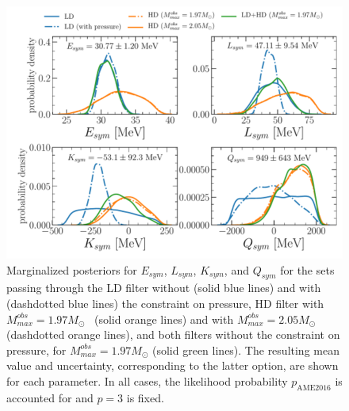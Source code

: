 \begin{figure}[!t]
\begin{center}
  \includegraphics[width=1.0\linewidth]{figures/iv_dist.pdf}
\end{center}
\caption[Marginalized posteriors for isovector empirical parameters assuming
different filters]{Marginalized posteriors for $E_{sym}$, $L_{sym}$, $K_{sym}$, 
and $Q_{sym}$ for the sets passing through the LD filter without (solid blue
lines) and with (dashdotted blue lines) the constraint on pressure, HD
filter with $M_{max}^{obs}=1.97M_\odot$~\cite{Antoniadis2013} (solid orange
lines) and with $M_{max}^{obs}=2.05M_\odot$~\cite{Cromartie2020}
(dashdotted orange lines), and both filters without the constraint on 
pressure, for $M_{max}^{obs}=1.97M_\odot$ (solid green lines). The resulting 
mean value and uncertainty, corresponding to the latter option, are shown for 
each parameter. In all cases, the likelihood probability $p_{\text{AME2016}}$ 
is accounted for and $p=3$ is fixed.}\label{fig:iv_dist}
\end{figure}
 
